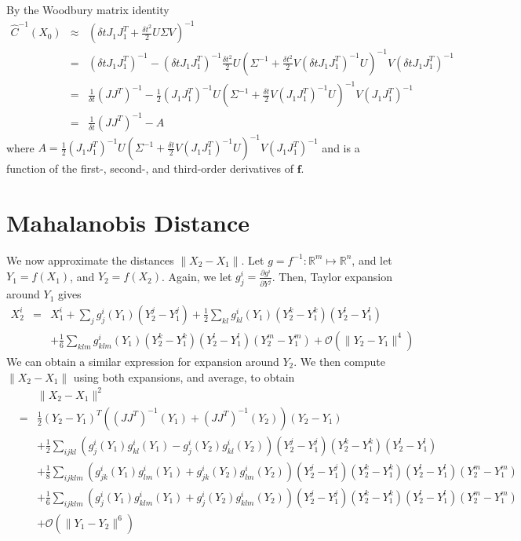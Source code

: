 \documentclass[12pt]{article}
\begin{document}
By the Woodbury matrix identity
\begin{eqnarray}
\hat{C}^{-1}(X_0) &\approx & 
\left( \delta t J_1 J_1^T + \frac{\delta t^2}{2}  U \Sigma V \right)^{-1} \\
&=& \left( \delta t J_1 J_1^T \right)^{-1} - 
\left( \delta t J_1 J_1^T \right)^{-1} \frac{\delta t^2}{2} U \left(\Sigma^{-1} + \frac{\delta t^2}{2} V \left( \delta t J_1 J_1^T \right)^{-1} U \right)^{-1} V \left( \delta t J_1 J_1^T \right)^{-1} \\
&=& \frac{1}{\delta t} \left( J J^T \right)^{-1}
- \frac{1}{2} (J_1 J_1^T)^{-1} U \left(\Sigma^{-1} + \frac{\delta t}{2} V \left( J_1 J_1^T \right)^{-1} U \right)^{-1} V \left( J_1 J_1^T \right)^{-1}  \\
&=& \frac{1}{\delta t} \left( J J^T \right)^{-1} - A
\end{eqnarray}
%
where $A = \frac{1}{2} (J_1 J_1^T)^{-1} U \left(\Sigma^{-1} + \frac{\delta t}{2} V \left( J_1 J_1^T \right)^{-1} U \right)^{-1} V \left( J_1 J_1^T \right)^{-1}$ and is a function of the first-, second-, and third-order derivatives of $\mathbf{f}$.

\section{Mahalanobis Distance}


We now approximate the distances $\| X_2 - X_1 \|$.
%
Let $g = f^{-1}: \mathbb{R}^m \mapsto \mathbb{R}^n$, and let $Y_1 = f(X_1)$, and $Y_2 = f(X_2)$.
%
Again, we let $g_j^i = \frac{\partial g^i}{\partial Y^j}$.
%
Then, Taylor expansion around $Y_1$ gives
%
\begin{eqnarray}
X_2^i &=& X_1^i + \sum_j g_j^i (Y_1) (Y^j_2 - Y^j_1 ) 
+ \frac{1}{2} \sum_{kl}  g^i_{kl} (Y_1) (Y^k_2 - Y^k_1)(Y^l_2 - Y^l_1) \\
&&+ \frac{1}{6} \sum_{klm}  g^i_{klm} (Y_1) (Y^k_2 - Y^k_1)(Y^l_2 - Y^l_1) (Y^m_2 - Y^m_1) 
+ \mathcal{O}( \|Y_2 - Y_1\|^4 )
\end{eqnarray}
%
We can obtain a similar expression for expansion around $Y_2$.
%
We then compute $\| X_2 - X_1\|$ using both expansions, and average, to obtain
%
\begin{eqnarray}
&&\| X_2 - X_1 \|^2 \\
&=& \frac{1}{2} (Y_2 - Y_1 )^T ((J J^T)^{-1} (Y_1) + (J J^T)^{-1}(Y_2)) (Y_2 - Y_1 ) \\
&& + \frac{1}{2} \sum_{ijkl} \left( g_j^i (Y_1) g^i_{kl} (Y_1) - g_j^i (Y_2) g^i_{kl} (Y_2) \right) (Y^j_2 - Y^j_1 )  (Y^k_2 - Y^k_1)(Y^l_2 - Y^l_1) \\
&& + \frac{1}{8} \sum_{ijklm}  \left( g^i_{jk} (Y_1) g^i_{lm} (Y_1) + g^i_{jk} (Y_2) g^i_{lm} (Y_2)  \right) (Y^j_2 - Y^j_1) (Y^k_2 - Y^k_1) (Y^l_2 - Y^l_1) (Y^m_2 - Y^m_1) \\
&& + \frac{1}{6} \sum_{ijklm}  \left( g^i_{j} (Y_1) g^i_{klm} (Y_1) + g^i_{j} (Y_2) g^i_{klm} (Y_2)  \right)(Y^j_2 - Y^j_1) (Y^k_2 - Y^k_1) (Y^l_2 - Y^l_1) (Y^m_2 - Y^m_1) \\
&& + \mathcal{O} (\|Y_1 - Y_2 \|^6 ) 
\end{eqnarray}
\end{document}
